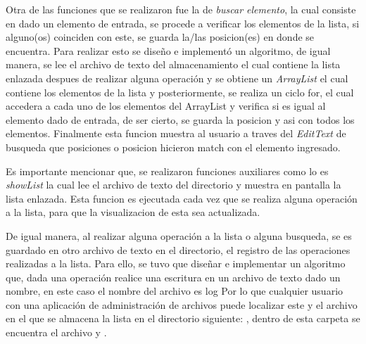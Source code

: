 \documentclass[conference]{IEEEtran}
\begin{document}


Otra de las funciones que se realizaron fue la de \textit{buscar elemento}, la cual consiste en dado un elemento de entrada, se procede a verificar los elementos de la lista, si alguno(os) coinciden con este, se guarda la/las posicion(es) en donde se encuentra. Para realizar esto se diseño e implementó un algoritmo, de igual manera, se lee el archivo de texto del almacenamiento el cual contiene la lista enlazada despues de realizar alguna operación y se obtiene un \textit{ArrayList} el cual contiene los elementos de la lista y posteriormente, se realiza un ciclo for, el cual accedera a cada uno de los elementos del ArrayList y verifica si es igual al elemento dado de entrada, de ser cierto, se guarda la posicion y asi con todos los elementos. Finalmente esta funcion muestra al usuario a traves del \textit{EditText} de busqueda que posiciones o posicion hicieron match con el elemento ingresado.

Es importante mencionar que, se realizaron funciones auxiliares como lo es \textit{showList} la cual lee el archivo de texto del directorio y muestra en pantalla la lista enlazada. Esta funcion es ejecutada cada vez que se realiza alguna operación a la lista, para que la visualizacion de esta sea actualizada.

De igual manera, al realizar alguna operación a la lista o alguna busqueda, se es guardado en otro archivo de texto en el directorio, el registro de las operaciones realizadas a la lista. Para ello, se tuvo que diseñar e implementar un algoritmo que, dada una operación realice una escritura en un archivo de texto dado un nombre, en este caso el nombre del archivo es log Por lo que cualquier usuario con una aplicación de administración de archivos puede localizar este y el archivo en el que se almacena la lista en el directorio siguiente: \texttt{}, dentro de esta carpeta se encuentra el archivo \texttt{} y \texttt{}.
\end{document}
